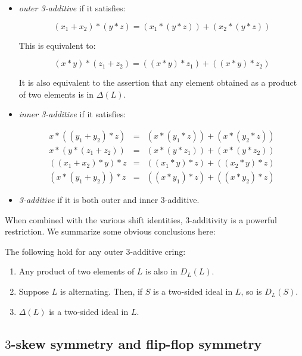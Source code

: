 \documentclass[10pt]{amsart}
\begin{document}
\begin{itemize}
\item {\em outer 3-additive} if it satisfies:

  \begin{equation}
    (x_1 + x_2) * (y * z) = (x_1 * (y * z)) + (x_2 * (y * z))
  \end{equation}

  This is equivalent to:

  \begin{equation}
    (x * y) * (z_1 + z_2) = ((x * y) * z_1) + ((x * y) * z_2)
  \end{equation}

  It is also equivalent to the assertion that any element obtained as
  a product of two elements is in $\Delta(L)$.
\item {\em inner 3-additive} if it satisfies:

  \begin{eqnarray*}
    x * ((y_1 + y_2) * z) & = & (x * (y_1 * z)) + (x * (y_2 * z))\\
    x * (y * (z_1 + z_2)) & = & (x * (y * z_1)) + (x * (y * z_2))\\
    ((x_1 + x_2) * y) * z & = & ((x_1 * y) * z) + ((x_2 * y) * z)\\
    (x * (y_1 + y_2)) * z & = & ((x * y_1) * z) + ((x * y_2) * z)
  \end{eqnarray*}
\item {\em 3-additive} if it is both outer and inner 3-additive.
\end{itemize}

When combined with the various shift identities, 3-additivity is a
powerful restriction. We summarize some obvious conclusions here:

\begin{lemma}
  The following hold for any outer 3-additive cring:

  \begin{enumerate}
  \item Any product of two elements of $L$ is also in $D_L(L)$.
  \item Suppose $L$ is alternating. Then, if $S$ is a two-sided ideal
    in $L$, so is $D_L(S)$.
  \item $\Delta(L)$ is a two-sided ideal in $L$.
  \end{enumerate}
\end{lemma}

\subsection{$3$-skew symmetry and flip-flop symmetry}
\end{document}
